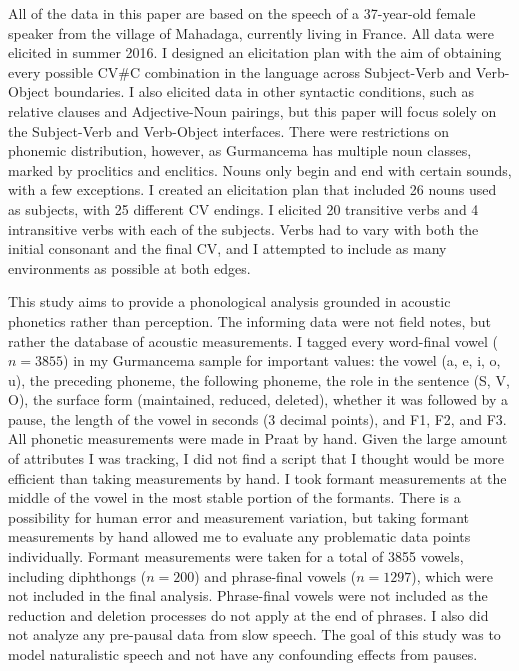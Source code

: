 \documentclass[output=paper,newtxmath,modfonts,nonflat,draftmode]{langsci/langscibook}
\begin{document}
All of the data in this paper are based on the speech of a 37-year-old female speaker from the village of Mahadaga, currently living in France. All data were elicited in summer 2016. I designed an elicitation plan with the aim of obtaining every possible CV\#C combination in the language across Subject-Verb and Verb-Object boundaries. I also elicited data in other syntactic conditions, such as relative clauses and Adjective-Noun pairings, but this paper will focus solely on the Subject-Verb and Verb-Object interfaces. There were restrictions on phonemic distribution, however, as Gurmancema has multiple noun classes, marked by proclitics and enclitics.  Nouns only begin and end with certain sounds, with a few exceptions. I created an elicitation plan that included 26 nouns used as subjects, with 25 different CV endings. I elicited 20 transitive verbs and 4 intransitive verbs with each of the subjects. Verbs had to vary with both the initial consonant and the final CV, and I attempted to include as many environments as possible at both edges. 

This study aims to provide a phonological analysis grounded in acoustic phonetics rather than perception. The informing data were not field notes, but rather the database of acoustic measurements. I tagged every word-final vowel ($n=3855$) in my Gurmancema sample for important values: the vowel (a, e, i, o, u), the preceding phoneme, the following phoneme, the role in the sentence (S, V, O), the surface form (maintained, reduced, deleted), whether it was followed by a pause, the length of the vowel in seconds (3 decimal points), and F1, F2, and 
F3. All phonetic measurements were made in Praat \citep{Boersma1996} by hand. Given the large amount of attributes I was tracking, I did not find a script that I thought would be more efficient than taking measurements by hand. I took formant measurements at the middle of the vowel in the most stable portion of the formants. There is a possibility for human error and measurement variation, but taking formant measurements by hand allowed me to evaluate any problematic data points individually. Formant measurements were taken for a total of 3855 vowels, including diphthongs ($n=200$) and phrase-final vowels ($n=1297$), which were not included in the final 
analysis. Phrase-final vowels were not included as the reduction and deletion processes do not apply at the end of phrases. I also did not analyze any pre-pausal data from slow speech. The goal of this study was to model naturalistic speech and not have any confounding effects from pauses. 
\end{document}
